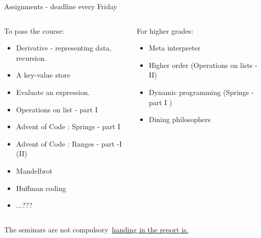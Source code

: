 \begin{frame}{Assignments - deadline every Friday}

\begin{columns}
 \begin{column}{0.6\linewidth}
   To pass the course:
   \begin{itemize}
   \item Derivative - representing data, recursion. 
   \item A key-value store
   \item Evaluate an expression. 
   \item Operations on list - part I
   \item Advent of Code : Springs - part I
   \item Advent of Code : Ranges - part -I (II)
   \item Mandelbrot
   \item Huffman coding
   \item ...???
   \end{itemize}
 \end{column}
 \begin{column}{0.4\linewidth}

   \pause
   For higher grades:
   \begin{itemize}
   \item Meta interpreter
   \item Higher order (Operations on lists - II)
   \item Dynamic programming (Springs - part I )
   \item Dining philosophers 
   \end{itemize}

 \end{column}
\end{columns}

\pause \vspace{20pt}
The seminars are not compulsory\pause\ \underline{handing in the report is.}

\end{frame}

